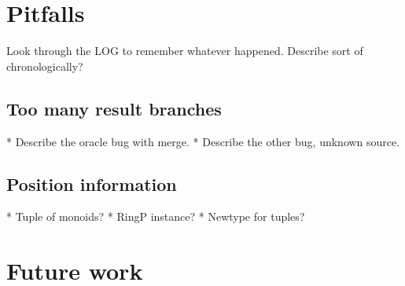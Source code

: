 \documentclass[a4paper,12pt,twosided]{report}
\begin{document}
\section{Pitfalls}
Look through the LOG to remember whatever happened. Describe sort of chronologically?

\subsection{Too many result branches}
* Describe the oracle bug with merge.
* Describe the other bug, unknown source.

\subsection{Position information}
* Tuple of monoids?
* RingP instance?
* Newtype for tuples?

\section{Future work}

%
%




%
%
\end{document}
